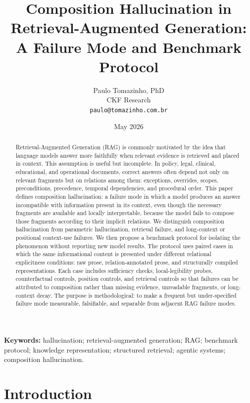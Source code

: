 \documentclass[11pt]{article}
\title{Composition Hallucination in Retrieval-Augmented Generation:\\
A Failure Mode and Benchmark Protocol}
\author{%
Paulo Tomazinho, PhD\\
CKF Research\\
\texttt{paulo@tomazinho.com.br}%
}
\date{May 2026}
\begin{document}
\maketitle

\begin{abstract}
\noindent
Retrieval-Augmented Generation (RAG) is commonly motivated by the idea that language models answer more faithfully when relevant evidence is retrieved and placed in context. This assumption is useful but incomplete. In policy, legal, clinical, educational, and operational documents, correct answers often depend not only on relevant fragments but on relations among them: exceptions, overrides, scopes, preconditions, precedence, temporal dependencies, and procedural order. This paper defines composition hallucination: a failure mode in which a model produces an answer incompatible with information present in its context, even though the necessary fragments are available and locally interpretable, because the model fails to compose those fragments according to their implicit relations. We distinguish composition hallucination from parametric hallucination, retrieval failure, and long-context or positional context-use failures. We then propose a benchmark protocol for isolating the phenomenon without reporting new model results. The protocol uses paired cases in which the same informational content is presented under different relational explicitness conditions: raw prose, relation-annotated prose, and structurally compiled representations. Each case includes sufficiency checks, local-legibility probes, counterfactual controls, position controls, and retrieval controls so that failures can be attributed to composition rather than missing evidence, unreadable fragments, or long-context decay. The purpose is methodological: to make a frequent but under-specified failure mode measurable, falsifiable, and separable from adjacent RAG failure modes.
\end{abstract}

\medskip
\noindent\textbf{Keywords:} hallucination; retrieval-augmented generation; RAG; benchmark protocol; knowledge representation; structured retrieval; agentic systems; composition hallucination.

\section{Introduction}
\end{document}
